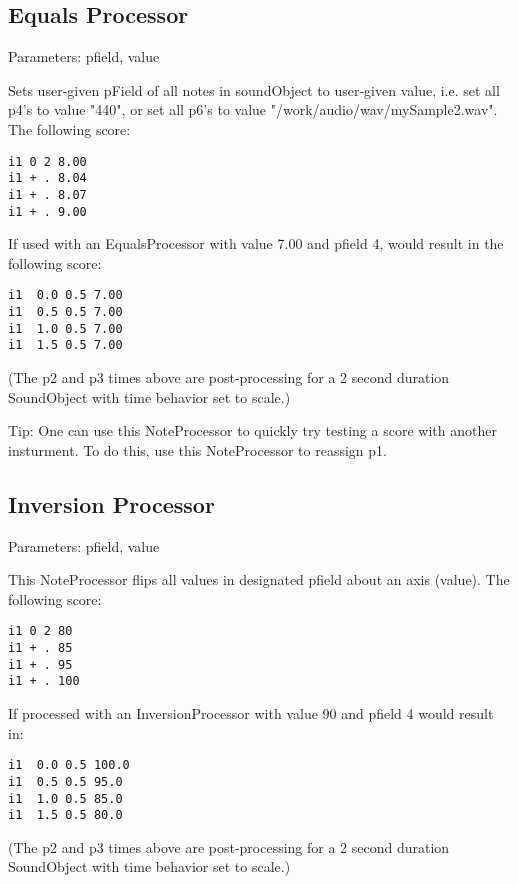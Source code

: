 \subsection{Equals Processor}\label{equalsProcessor}

Parameters: pfield, value

Sets user-given pField of all notes in soundObject to user-given value,
i.e. set all p4's to value "440", or set all p6's to value
"/work/audio/wav/mySample2.wav". The following score:

\begin{verbatim}
i1 0 2 8.00
i1 + . 8.04
i1 + . 8.07
i1 + . 9.00    
\end{verbatim}

If used with an EqualsProcessor with value 7.00 and pfield 4, would
result in the following score:

\begin{verbatim}
i1  0.0 0.5 7.00
i1  0.5 0.5 7.00
i1  1.0 0.5 7.00
i1  1.5 0.5 7.00
\end{verbatim}

(The p2 and p3 times above are post-processing for a 2 second duration
SoundObject with time behavior set to scale.)

Tip: One can use this NoteProcessor to quickly try testing a score with
another insturment. To do this, use this NoteProcessor to reassign p1.


\subsection{Inversion Processor}\label{inversionProcessor}

Parameters: pfield, value

This NoteProcessor flips all values in designated pfield about an axis
(value). The following score:

\begin{verbatim}
i1 0 2 80
i1 + . 85
i1 + . 95
i1 + . 100
\end{verbatim}

If processed with an InversionProcessor with value 90 and pfield 4 would
result in:

\begin{verbatim}
i1  0.0 0.5 100.0
i1  0.5 0.5 95.0
i1  1.0 0.5 85.0
i1  1.5 0.5 80.0    
\end{verbatim}

(The p2 and p3 times above are post-processing for a 2 second duration
SoundObject with time behavior set to scale.)


